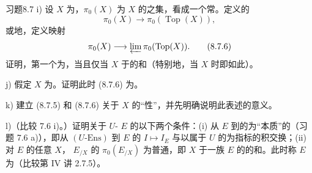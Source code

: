 \begin{SGAresult}{习题}{8.7}
 i) 设 $X$ 为，$\pi_0(X)$ 为 $X$ 的之集，看成一个常。定义的
\[\pi_0(X)\longrightarrow\pi_0(\operatorname{Top}(X)),\tag{8.7.5}\]
或地，定义映射
\[\pi_0(X)\longrightarrow\varprojlim\pi_0(\operatorname{Top}(X)).\tag{8.7.6}\]
证明，第一个为，当且仅当 $X$ 于的和（特别地，当 $X$ 时即如此）。

 j) 假定 $X$ 为。证明此时 (8.7.6) 为。

 k) 建立 (8.7.5) 和 (8.7.6) 关于 $X$ 的“性”，并先明确说明此表述的意义。

 l)（比较 7.6 i)。）证明关于 $U$- $E$ 的以下两个条件：(i) 从 $E$ 到的为“本质”的（习题 7.6 a)），即从 $(U\text{-}\mathrm{Ens})$ 到 $E$ 的 $I\mapsto I_E$ 与以属于 $U$ 的为指标的积交换；(ii) 对 $E$ 的任意 $X$， $E_{/X}$ 的 $\pi_0(E_{/X})$ 为普通，即 $X$ 于一族 $E$ 的的和。此时称 $E$ 为（比较第 IV 讲 2.7.5）。
\end{SGAresult}

